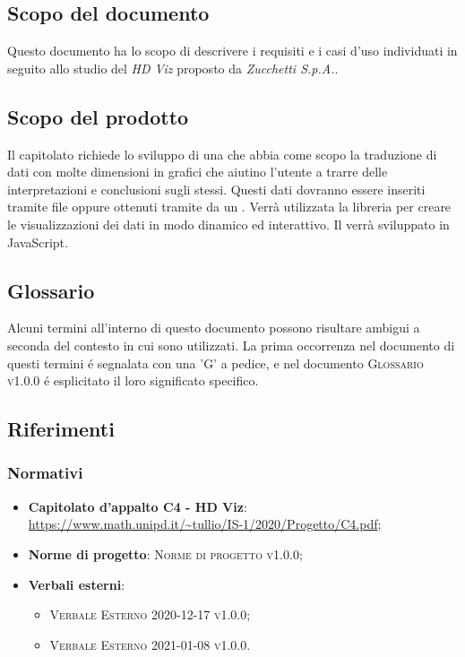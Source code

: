 \documentclass[../analisi-dei-requisiti.tex]{subfiles}
\begin{document}
\subsection{Scopo del documento}%
\label{sub:scopo_del_documento}
Questo documento ha lo scopo di descrivere i requisiti e i casi d'uso individuati in seguito allo studio del  \emph{HD Viz} proposto da \emph{Zucchetti S.p.A.}. 

\subsection{Scopo del prodotto}%
\label{sub:scopo_del_prodotto}
Il capitolato richiede lo sviluppo di una  che abbia come scopo la 
traduzione di dati con molte dimensioni in grafici che aiutino l’utente a trarre delle interpretazioni e conclusioni sugli stessi. 
Questi dati dovranno essere inseriti tramite file  oppure ottenuti tramite  da un .
Verrà utilizzata la libreria   per creare le visualizzazioni dei dati in modo dinamico ed interattivo.
Il  verrà sviluppato in JavaScript. 


\subsection{Glossario}
\label{sub:glossario}
Alcuni termini all'interno di questo documento possono risultare ambigui a seconda del contesto in cui sono utilizzati.
La prima occorrenza nel documento di questi termini é segnalata con una 'G' a pedice, e nel documento 
\textsc{Glossario v1.0.0} é esplicitato il loro significato specifico.


\subsection{Riferimenti}
\label{sub:riferimenti}

\subsubsection{Normativi}%
\label{ssub:normativi}


\begin{itemize}
  \item \textbf{Capitolato d'appalto C4 - HD Viz}: \\
  \url{https://www.math.unipd.it/~tullio/IS-1/2020/Progetto/C4.pdf};
  \item \textbf{Norme di progetto}: \textsc{Norme di progetto v1.0.0};
  \item \textbf{Verbali esterni}:
  \begin{itemize}
    \item \textsc{Verbale Esterno 2020-12-17 v1.0.0};
    \item \textsc{Verbale Esterno 2021-01-08 v1.0.0}.
  \end{itemize}
\end{itemize}
\end{document}
